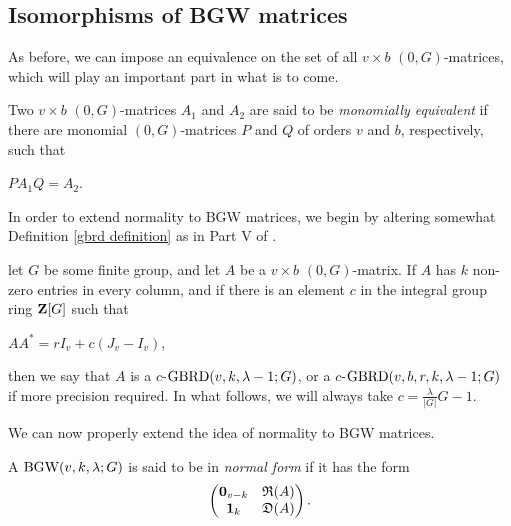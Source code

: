 \documentclass[../../../main]{subfiles}
\begin{document}
\dinkus


\subsection{Isomorphisms of BGW matrices}

As before, we can impose an equivalence on the set of all $v \times b$ $(0,G)$-matrices, which will play an important part in what is to come. 

\begin{defin}\label{monomial-equiv}
  Two $v \times b$ $(0,G)$-matrices $A_1$ and $A_2$ are said to be {\it monomially equivalent} if there are monomial $(0,G)$-matrices $P$ and $Q$ of orders $v$ and $b$, respectively, such that 
  \begin{defenum}
  \item $PA_1Q=A_2$.
  \end{defenum}
\end{defin}

 In order to extend normality to BGW matrices, we begin by altering somewhat Definition \ref{gbrd definition} as in Part V of \cite{handbook}.
 
 \begin{defin}\label{c-gbrd defintion}
   let $G$ be some finite group, and let $A$ be a $v \times b$ $(0,G)$-matrix.
   If $A$ has $k$ non-zero entries in every column, and if there is an element
   $c$ in the integral group ring $\mathbf{Z}[G]$ such that 
  \begin{defenum}
   \item\label{c-gbrd-eq} $AA^* = rI_v + c(J_v - I_v)$,
  \end{defenum}
  then we say that $A$ is a $c$-$\text{GBRD}(v,k,\lambda-1;G)$, or a
  $c$-$\text{GBRD}(v,b,r,k,\lambda-1;G)$ if more precision required. In what follows,
  we will always take $c = \frac{\lambda}{|G|}G - 1$.
 \end{defin}
 
 We can now properly extend the idea of normality to BGW matrices.
 
 \begin{defin}
  A $\text{BGW}(v,k,\lambda;G)$ is said to be in {\it normal form} if it has the form
  \begin{equation}
   \begin{pmatrix}
    \mathbf{0}_{v-k} & \mathfrak{R}(A) \\ \mathbf{1}_{k} & \mathfrak{D}(A)
   \end{pmatrix}.
  \end{equation}
 \end{defin}
 
\end{document}
